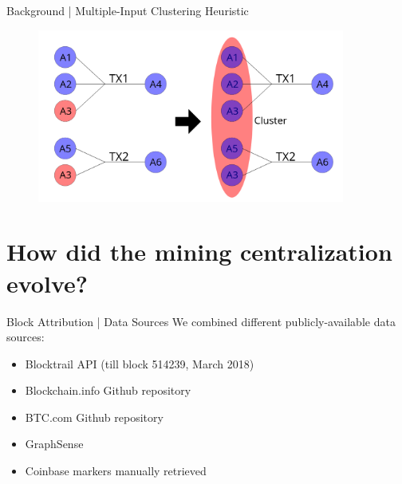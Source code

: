 \documentclass[10pt]{beamer}
\begin{document}
\begin{frame}[fragile]{Background | Multiple-Input Clustering Heuristic}
    \begin{figure}
        \centering
        \includegraphics[width=0.9\textwidth]{images/clustering3.png}
    \end{figure}
    \begin{figure}
        \centering
        \def\svgwidth{\columnwidth}
        
    \end{figure}
\end{frame}

\section{How did the mining centralization evolve?}
\begin{frame}[fragile]{Block Attribution | Data Sources}
    We combined different publicly-available data sources:
    \begin{itemize}
        \item Blocktrail API (till block 514239, March 2018)
        \item Blockchain.info Github repository
        \item BTC.com Github repository
        \item GraphSense
        \item Coinbase markers manually retrieved
    \end{itemize}
\end{frame}
\end{document}
